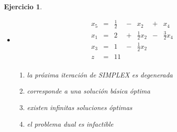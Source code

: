 \documentclass[a4paper,oneside,12pt]{amsart}
\newtheorem{quest}{Ejercicio}
\begin{document}
\begin{quest}
\begin{itemize}
    \item[(2)]
            \[
            \begin{array}{rrrrrrr}
                x_5&=&\frac{1}{2}&-&x_2&+&x_4\\
                x_1&=&2&+&\frac{1}{2}x_2&-&\frac{3}{2}x_4\\
                x_3&=&1&-&\frac{1}{2}x_2&&\\ \hline
                z&=&11&&&&\\
            \end{array}
            \]
            \begin{enumerate}
                \item[(a)] la próxima iteración de SIMPLEX es degenerada
                \item[(b)] corresponde a una solución básica óptima
                \item[(c)] existen infinitas soluciones óptimas
                \item[(d)] el problema dual es infactible
            \end{enumerate}

\end{itemize}
\end{quest}

\end{document}
